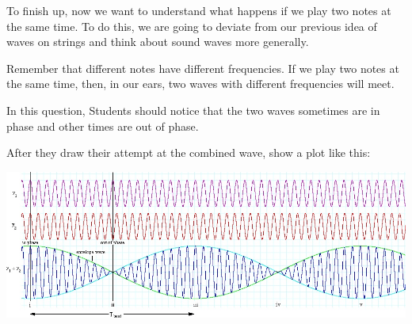 \documentclass[12pt,noauthor,nooutcomes, instructornotes]{ximera}
\begin{document}
\begin{question} To finish up, now we want to understand what happens if we play two notes at the same time. To do this, we are going to deviate from our previous idea of waves on strings and think about sound waves more generally.

Remember that different notes have different frequencies. If we play two notes at the same time, then, in our ears, two waves with different frequencies will meet. 

\begin{instructorNotes}
In this question, Students should notice that the two waves sometimes are in phase and other times are out of phase.

After they draw their attempt at the combined wave, show a plot like this:

\includegraphics[width=\textwidth]{superposition/beats.jpg}



\end{instructorNotes}



\end{question}
\end{document}
